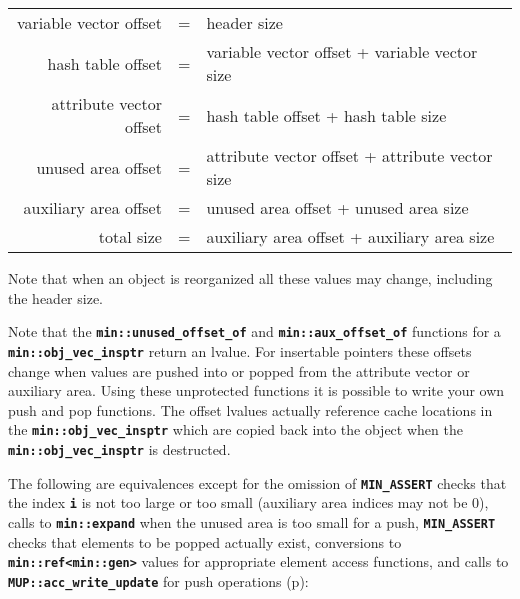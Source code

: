 \documentclass[12pt]{article}
\newcommand{\TT}[1]{{\tt \bfseries #1}}
\newcommand{\pagref}[1]{p\pageref{#1}}
\newcommand{\EOL}{\penalty \exhyphenpenalty}
\begin{document}
\begin{center}
\begin{tabular}{rcl}
variable vector offset	& = & header size \\
hash table offset       & = & variable vector offset + variable vector size \\
attribute vector offset & = & hash table offset + hash table size \\
unused area offset      & = & attribute vector offset + attribute vector size \\
auxiliary area offset   & = & unused area offset + unused area size \\
total size              & = & auxiliary area offset + auxiliary area size \\
\end{tabular}
\end{center}

Note that when an object is reorganized all these values may
change, including the header size.

Note that the \TT{min::\EOL unused\_\EOL offset\_\EOL of} and
\TT{min::\EOL aux\_\EOL offset\_\EOL of} functions for a
\TT{min::\EOL obj\_\EOL vec\_\EOL insptr} return an
lvalue.  For insertable pointers these offsets change when
values are pushed into or popped from the attribute vector or
auxiliary area.  Using these unprotected functions it is possible
to write your own push and pop functions.  The offset lvalues
actually reference cache locations in the
\TT{min::\EOL obj\_\EOL vec\_\EOL insptr} which are copied
back into the object when the 
\TT{min::\EOL obj\_\EOL vec\_\EOL insptr} is destructed.

The following are equivalences except for
the omission of \TT{MIN\_\EOL ASSERT} checks that the index \TT{i}
is not too large or too small (auxiliary area indices may not be 0),
calls to \TT{min::\EOL expand} when the unused area is too small
for a push, \TT{MIN\_\EOL ASSERT} checks that elements to be popped
actually exist,
conversions to \TT{min::ref<min::gen>}
values for appropriate element access functions, and
calls to \TT{MUP::\EOL acc\_\EOL write\_\EOL update}
for push operations
(\pagref{MUP::ACC_WRITE_GEN_UPDATE}):
\end{document}
